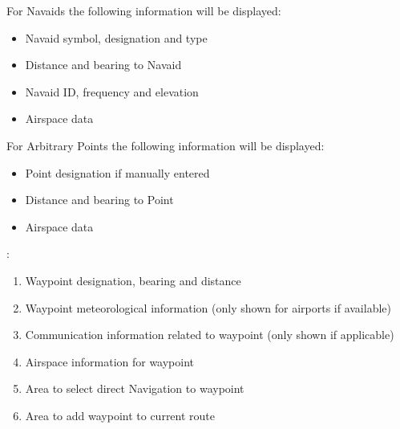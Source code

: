 \documentclass[letterpaper,10pt,english]{sphinxmanual}
\begin{document}
For Navaids the following information will be displayed:
\begin{itemize}
\item {} 
Navaid symbol, designation and type

\item {} 
Distance and bearing to Navaid

\item {} 
Navaid ID, frequency and elevation

\item {} 
Airspace data

\end{itemize}

For Arbitrary Points the following information will be displayed:
\begin{itemize}
\item {} 
Point designation if manually entered

\item {} 
Distance and bearing to Point

\item {} 
Airspace data

\end{itemize}

\begin{figure}[htbp]
\centering

\noindent{}
\end{figure}

:
\begin{enumerate}
%
\item {} 
Waypoint designation, bearing and distance

\item {} 
Waypoint meteorological information (only shown for airports if available)

\item {} 
Communication information related to waypoint (only shown if applicable)

\item {} 
Airspace information for waypoint

\item {} 
Area to select direct Navigation to waypoint

\item {} 
Area to add waypoint to current route

\end{enumerate}
\end{document}
